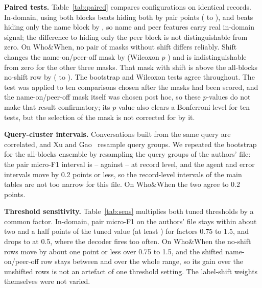 \documentclass[conference]{IEEEtran}
\begin{document}


\textbf{Paired tests.} Table~\ref{tab:paired} compares configurations on identical records. In-domain, using both blocks beats hiding both by \ptAEallNeither{} pair points (\ptAEallNeitherLo{} to \ptAEallNeitherHi), and beats hiding only the name block by \ptAEallNames, so name and peer features carry real in-domain signal; the difference to hiding only the peer block is not distinguishable from zero. On Who\&When, no pair of masks without shift differs reliably. Shift changes the name-on/peer-off mask by \sgDdOF{} (Wilcoxon $p$ \ptWWnameShiftP) and is indistinguishable from zero for the other three masks. That mask with shift is above the all-blocks no-shift row by \ptWWnameShiftVsAll{} (\ptWWnameShiftVsAllLo{} to \ptWWnameShiftVsAllHi). The bootstrap and Wilcoxon tests agree throughout. The test was applied to ten comparisons chosen after the masks had been scored, and the name-on/peer-off mask itself was chosen post hoc, so these $p$-values do not make that result confirmatory; its $p$-value also clears a Bonferroni level for ten tests, but the selection of the mask is not corrected for by it.



\textbf{Query-cluster intervals.} Conversations built from the same query are correlated, and Xu and Gao~\cite{audit2} resample query groups. We repeated the bootstrap for the all-blocks ensemble by resampling the \clAEgroups{} query groups of the authors' file: the pair micro-F1 interval is \clAEpairLo--\clAEpairHi{} against \ensAEpairLo--\ensAEpairHi{} at record level, and the agent and error intervals move by 0.2 points or less, so the record-level intervals of the main tables are not too narrow for this file. On Who\&When the two agree to 0.2 points.

\textbf{Threshold sensitivity.} Table~\ref{tab:sens} multiplies both tuned thresholds by a common factor. In-domain, pair micro-F1 on the authors' file stays within about two and a half points of the tuned value (at least \sensAEmin) for factors 0.75 to 1.5, and drops to \sensAEhalf{} at 0.5, where the decoder fires too often. On Who\&When the no-shift rows move by about one point or less over 0.75 to 1.5, and the shifted name-on/peer-off row stays between \sensShiftMin{} and \sensShiftMax{} over the whole range, so its gain over the unshifted rows is not an artefact of one threshold setting. The label-shift weights themselves were not varied.


\end{document}
